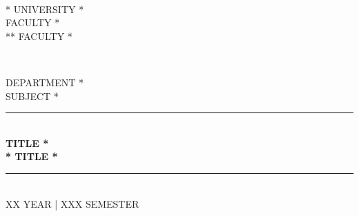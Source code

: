 \documentclass[12pt,a4paper, spanish]{article}
\begin{document}
\begin{titlepage}
  \newcommand{\HRule}{\rule{\linewidth}{0.5mm}}
  \centering

   \textsc{}\\[0.25cm]

   \textsc{\huge{* UNIVERSITY *}}\\[0.5cm]

   \textsc{\LARGE * FACULTY *\\ ** FACULTY *}\\[0.3cm]

   \begin{figure}[H]
     \centering
     \qquad
     \\[0.5cm]
   \end{figure}

   \textsc{\Large * DEPARTMENT *}\\[0.25cm]

   \textsc{\large * SUBJECT *}\\[0.25cm]

   \HRule\\[0.4cm]

   {\huge\bfseries * TITLE *\\[0.4cm] * TITLE *}\\[0.4cm]
   \HRule\\[1.25cm]

    \textsc{\large XX YEAR | XXX SEMESTER}\\[1.5cm]


\end{titlepage}
\end{document}
